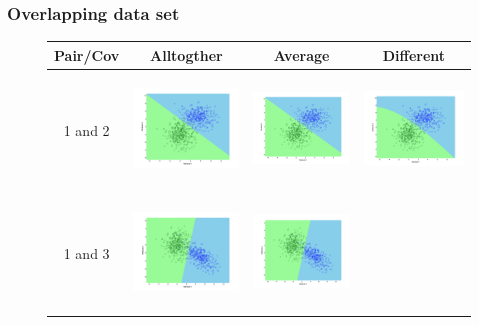 \documentclass[a4paper]{article}
\begin{document}
		\subsubsection{Overlapping data set}
				
			\begin{figure}
			\begin{tabular}{|c|c|c|c|}
				\hline
				Pair/Cov &  Alltogther & Average & Different	\\
				\hline
				1 and
				2&\includegraphics[width=40mm,height=30mm]{bayes/over/pair/12/all_cov.png}&\includegraphics[width=40mm,height=30mm]{bayes/over/pair/12/avg_cov.png}
				&\includegraphics[width=40mm,height=30mm]{bayes/over/pair/12/diff_cov.png}\\
				\hline
				1 and
				3&\includegraphics[width=40mm,height=30mm]{bayes/over/pair/13/all_cov.png}&\includegraphics[width=40mm,height=30mm]{bayes/over/pair/13/avg_cov.png}

\end{tabular}
\end{figure}
\end{document}
